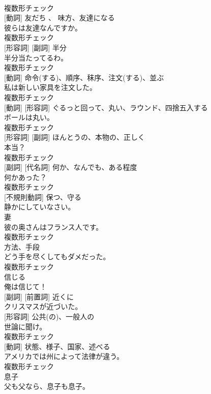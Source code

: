 \documentclass[8pt]{extreport}
\begin{document}
\begin{CJK}{UTF8}{min}
\\	複数形チェック
\\	[名詞] [動詞]	友だち 、 味方、友達になる	
\\	彼らは友達なんですか。	
\\	複数形チェック
\\	[名詞] [形容詞] [副詞]	半分	
\\	半分当たってるわ。	
\\	複数形チェック
\\	[名詞] [動詞]	命令(する)、順序、秣序、注文(する)、並ぶ	
\\	私は新しい家具を注文した。	
\\	複数形チェック
\\	[名詞] [動詞] [形容詞]	ぐるっと回って、丸い、ラウンド、四捨五入する	
\\	ボールは丸い。	
\\	複数形チェック
\\	[名詞] [形容詞] [副詞]	ほんとうの、本物の、正しく	
\\	本当？	
\\	複数形チェック
\\	[名詞] [副詞] [代名詞]	何か、なんでも、ある程度	
\\	何かあった？	
\\	複数形チェック
\\	[動詞] [不規則動詞]	保つ、守る	
\\	静かにしていなさい。	
\\	[名詞]	妻	
\\	彼の奥さんはフランス人です。	
\\	複数形チェック
\\	[名詞]	方法、手段	
\\	どう手を尽くしてもダメだった。	
\\	複数形チェック
\\	[動詞]	信じる	
\\	俺は信じて！	
\\	[形容詞] [副詞] [前置詞]	近くに	
\\	クリスマスが近づいた。	
\\	[名詞] [形容詞]	公共(の)、一般人の	
\\	世論に聞け。	
\\	複数形チェック
\\	[名詞] [動詞]	状態、様子、国家、述べる	
\\	アメリカでは州によって法律が違う。	
\\	複数形チェック
\\	[名詞]	息子	
\\	父も父なら、息子も息子。	

\end{CJK}
\end{document}
